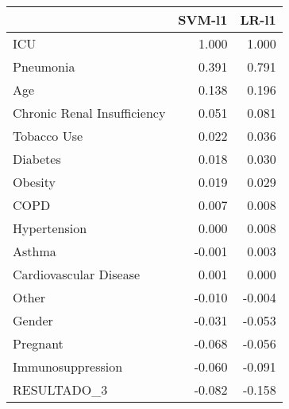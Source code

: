\begin{tabular}{lrr}
\toprule
{} &  SVM-l1 &  LR-l1 \\
\midrule
ICU                         &   1.000 &  1.000 \\
Pneumonia                   &   0.391 &  0.791 \\
Age                         &   0.138 &  0.196 \\
Chronic Renal Insufficiency &   0.051 &  0.081 \\
Tobacco Use                 &   0.022 &  0.036 \\
Diabetes                    &   0.018 &  0.030 \\
Obesity                     &   0.019 &  0.029 \\
COPD                        &   0.007 &  0.008 \\
Hypertension                &   0.000 &  0.008 \\
Asthma                      &  -0.001 &  0.003 \\
Cardiovascular Disease      &   0.001 &  0.000 \\
Other                       &  -0.010 & -0.004 \\
Gender                      &  -0.031 & -0.053 \\
Pregnant                    &  -0.068 & -0.056 \\
Immunosuppression           &  -0.060 & -0.091 \\
RESULTADO\_3                 &  -0.082 & -0.158 \\
\bottomrule
\end{tabular}

